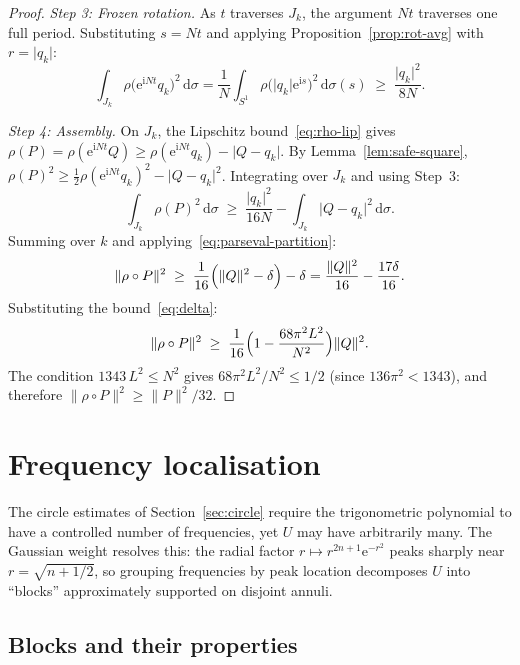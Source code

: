 \documentclass[11pt]{amsart}
\theoremstyle{definition}
\theoremstyle{remark}
\begin{document}
\begin{proof}
\noindent
\emph{Step 3: Frozen rotation.}\;
As $t$ traverses $J_k$, the argument $Nt$ traverses one full period.
Substituting $s = Nt$ and applying Proposition~\ref{prop:rot-avg} with
$r = \lvert q_k \rvert$:
\[
\int_{J_k}\rho\bigl(\mathrm{e}^{\mathrm{i} Nt} q_k\bigr)^2\,\mathrm{d}\sigma
= \frac{1}{N}\int_{S^1}\rho\bigl(\lvert q_k \rvert\mathrm{e}^{\mathrm{i} s}\bigr)^2\,\mathrm{d}\sigma(s)
\;\ge\; \frac{\lvert q_k \rvert^2}{8N}.
\]

\noindent
\emph{Step 4: Assembly.}\;
On $J_k$, the Lipschitz bound~\eqref{eq:rho-lip} gives
$\rho(P) = \rho(\mathrm{e}^{\mathrm{i} Nt}Q)
\ge \rho(\mathrm{e}^{\mathrm{i} Nt}q_k) - \lvert Q - q_k \rvert$.
By Lemma~\ref{lem:safe-square},
$\rho(P)^2 \ge \tfrac{1}{2}\rho(\mathrm{e}^{\mathrm{i} Nt}q_k)^2 - \lvert Q - q_k \rvert^2$.
Integrating over $J_k$ and using Step~3:
\[
\int_{J_k}\rho(P)^2\,\mathrm{d}\sigma
\;\ge\; \frac{\lvert q_k \rvert^2}{16N} - \int_{J_k}\lvert Q-q_k \rvert^2\,\mathrm{d}\sigma.
\]
Summing over $k$ and applying~\eqref{eq:parseval-partition}:
\[
\lVert \rho \circ P \rVert^2
\;\ge\; \frac{1}{16}\Bigl(\lVert Q \rVert^2 - \delta\Bigr) - \delta
= \frac{\lVert Q \rVert^2}{16} - \frac{17\delta}{16}.
\]
Substituting the bound~\eqref{eq:delta}:
\[
\lVert \rho \circ P \rVert^2
\;\ge\;
\frac{1}{16}\Bigl(1 - \frac{68\pi^2 L^2}{N^2}\Bigr)\lVert Q \rVert^2.
\]
The condition $1343\,L^2 \le N^2$ gives $68\pi^2 L^2/N^2 \le 1/2$
(since $136\pi^2 < 1343$), and therefore
$\lVert \rho \circ P \rVert^2 \ge \lVert P \rVert^2/32$.
\end{proof}
 \section{Frequency localisation}\label{sec:blocks}

The circle estimates of Section~\ref{sec:circle} require the trigonometric
polynomial to have a controlled number of frequencies, yet $U$ may have
arbitrarily many.  The Gaussian weight resolves this: the radial factor
$r \mapsto r^{2n+1}\mathrm{e}^{-r^2}$ peaks sharply near $r = \sqrt{n + 1/2}$,
so grouping frequencies by peak location decomposes $U$ into ``blocks''
approximately supported on disjoint annuli.

\subsection{Blocks and their properties}\label{sec:block-def}
\end{document}
